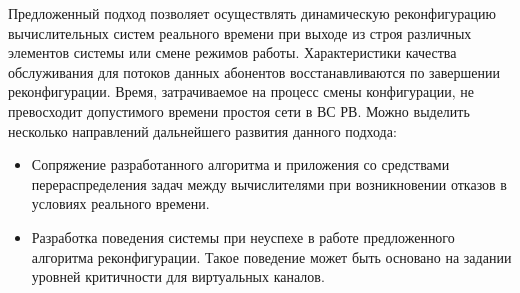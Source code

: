 \documentclass[12pt, a4paper]{article}
\begin{document}
Предложенный подход позволяет осуществлять динамическую реконфигурацию вычислительных систем реального времени при выходе из строя различных элементов системы или смене режимов работы. Характеристики качества обслуживания для потоков данных абонентов восстанавливаются по завершении реконфигурации. Время, затрачиваемое на процесс смены конфигурации, не превосходит допустимого времени простоя сети в ВС РВ. Можно выделить несколько направлений дальнейшего развития данного подхода:
\begin{itemize}
	\item Сопряжение разработанного алгоритма и приложения со средствами перераспределения задач между вычислителями при возникновении отказов в условиях реального времени.
	\item Разработка поведения системы при неуспехе в работе предложенного алгоритма реконфигурации. Такое поведение может быть основано на задании уровней критичности для виртуальных каналов.
\end{itemize}
\end{document}
